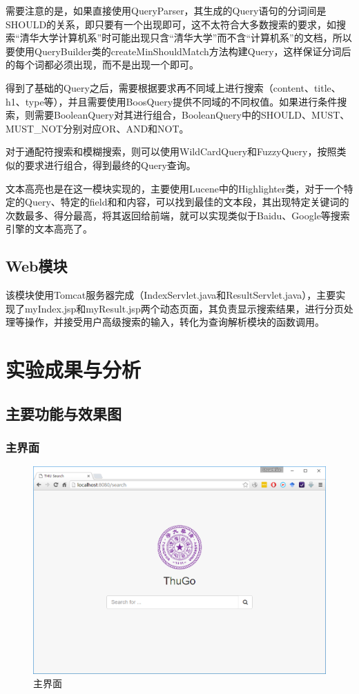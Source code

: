 \documentclass[paper=a4, fontsize=11pt, UTF8]{article} %
\numberwithin{equation}{section} %
\numberwithin{figure}{section} %
\numberwithin{table}{section} %
\begin{document}
需要注意的是，如果直接使用QueryParser，其生成的Query语句的分词间是SHOULD的关系，即只要有一个出现即可，这不太符合大多数搜索的要求，如搜索“清华大学计算机系”时可能出现只含“清华大学”而不含“计算机系”的文档，所以要使用QueryBuilder类的createMinShouldMatch方法构建Query，这样保证分词后的每个词都必须出现，而不是出现一个即可。

得到了基础的Query之后，需要根据要求再不同域上进行搜索（content、title、h1、type等），并且需要使用BoosQuery提供不同域的不同权值。如果进行条件搜索，则需要BooleanQuery对其进行组合，BooleanQuery中的SHOULD、MUST、MUST\_NOT分别对应OR、AND和NOT。

对于通配符搜索和模糊搜索，则可以使用WildCardQuery和FuzzyQuery，按照类似的要求进行组合，得到最终的Query查询。

文本高亮也是在这一模块实现的，主要使用Lucene中的Highlighter类，对于一个特定的Query、特定的field和和内容，可以找到最佳的文本段，其出现特定关键词的次数最多、得分最高，将其返回给前端，就可以实现类似于Baidu、Google等搜索引擎的文本高亮了。

\subsection{Web模块}

该模块使用Tomcat服务器完成（IndexServlet.java和ResultServlet.java），主要实现了myIndex.jsp和myResult.jsp两个动态页面，其负责显示搜索结果，进行分页处理等操作，并接受用户高级搜索的输入，转化为查询解析模块的函数调用。


\section{实验成果与分析}

\subsection{主要功能与效果图}

\subsubsection{主界面}

\begin{figure}[htp]
\center
\includegraphics[width=\textwidth]{ss1}
\caption{主界面} \label{ss1}
\end{figure}
\end{document}

